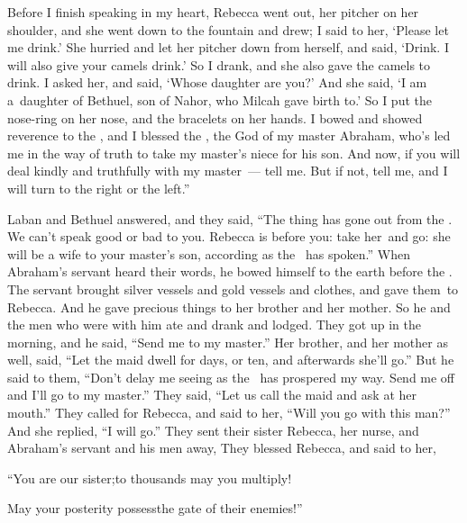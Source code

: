 \begin{inparaenum}
   Before I finish speaking in my heart, Rebecca went out, her pitcher on her shoulder, and she went down to the fountain and drew; I said to her, `Please let me drink.'%
   She hurried and let her pitcher down from herself, and said, `Drink. I will also give your camels drink.' So I drank, and she also gave the camels to drink.%
   I asked her, and said, `Whose daughter are you?' And she said, `I am a\understood{}\ daughter of Bethuel, son of Nahor, who Milcah gave birth to.' So I put the nose-ring on her nose, and the bracelets on her hands.%
   I bowed and showed reverence to the \lord, and I blessed the \lord, the God of my master Abraham, who's led me in the way of truth to take my master's niece for his son.%
   And now, if you will deal kindly and truthfully with my master~--- tell me. But if not, tell me, and I will turn to the right or the left.''%

   Laban and Bethuel answered, and they said, ``The thing has gone out from the \lord. We can't speak good or bad to you.%
   Rebecca is before you: take her\understood{}\ and go: she will be a wife to your master's son, according as the \lord\ has spoken.''%
   When Abraham's servant heard their words, he bowed himself to the earth before the \lord.%
   The servant brought silver vessels and gold vessels and clothes, and gave them\understood{}\ to Rebecca. And he gave precious things to her brother and her mother.%
   So he and the men who were with him ate and drank and lodged. They got up in the morning, and he said, ``Send me to my master.''%
   Her brother, and her mother as well, said, ``Let the maid dwell for days, or ten, and afterwards she'll go.''%
   But he said to them, ``Don't delay me seeing as the \lord\ has prospered my way. Send me off and I'll go to my master.''%
   They said, ``Let us call the maid and ask at her mouth.''%
   They called for Rebecca, and said to her, ``Will you go with this man?'' And she replied, ``I will go.''%
   They sent their sister Rebecca, her nurse, and Abraham's servant and his men away,%
   They blessed Rebecca, and said to her,%

  \smallskip\pd{}``You are our sister;\pa{}to thousands may you multiply!%

  \pd{}May your posterity possess\pa{}the gate of their enemies!''%


\end{inparaenum}
